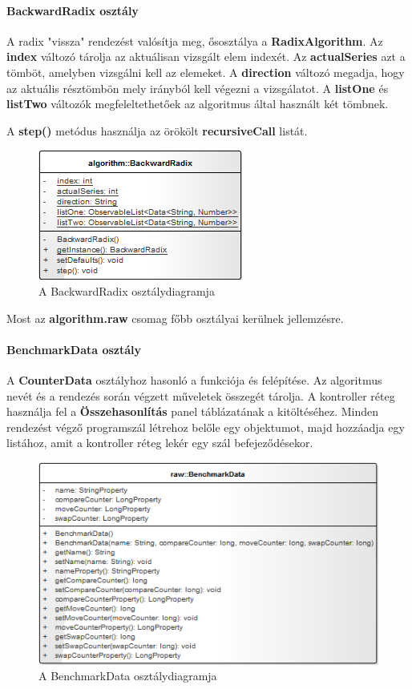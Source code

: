 \documentclass{elteikthesis}
\begin{document}
\paragraph{BackwardRadix osztály}
A radix "vissza" rendezést valósítja meg, ősosztálya a \textbf{RadixAlgorithm}.
Az \textbf{index} változó tárolja az aktuálisan vizsgált elem indexét. Az \textbf{actualSeries} azt a tömböt, amelyben vizsgálni kell az elemeket. A \textbf{direction} változó megadja, hogy az aktuális résztömbön mely irányból kell végezni a vizsgálatot. A \textbf{listOne} és \textbf{listTwo} változók megfeleltethetőek az algoritmus által használt két tömbnek.\par
A \textbf{step()} metódus használja az örökölt \textbf{recursiveCall} listát.
\begin{figure}[H]
	\centering
	\includegraphics{pics/class/BackwardRadix.png}
	\caption{A BackwardRadix osztálydiagramja}
\end{figure}
Most az \textbf{algorithm.raw} csomag főbb osztályai kerülnek jellemzésre.
\paragraph{BenchmarkData osztály}
A \textbf{CounterData} osztályhoz hasonló a funkciója és felépítése. Az algoritmus nevét és a rendezés során végzett műveletek összegét tárolja. A kontroller réteg használja fel a \textbf{Összehasonlítás} panel táblázatának a kitöltéséhez. Minden rendezést végző programszál létrehoz belőle egy objektumot, majd hozzáadja egy listához, amit a kontroller réteg lekér egy szál befejeződésekor.
\begin{figure}[H]
	\centering
	\includegraphics{pics/class/BenchmarkData.png}
	\caption{A BenchmarkData osztálydiagramja}
\end{figure}
\end{document}
